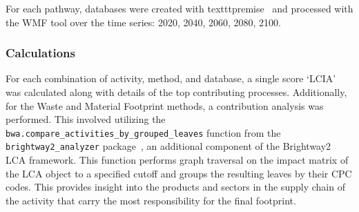 For each pathway, databases were created with texttt{premise}~\citep{sacchi2022premise} and processed with the WMF tool over the time series: 2020, 2040, 2060, 2080, 2100.

\subsubsection{Calculations}
For each combination of activity, method, and database, a single score `LCIA' was calculated along with details of the top contributing processes. Additionally, for the Waste and Material Footprint methods, a contribution analysis was performed. This involved utilizing the \texttt{bwa.compare\_activities\_by\_grouped\_leaves} function from the \texttt{brightway2\_analyzer} package~\cite{mutel2016brightway2analyzer}, an additional component of the Brightway2 LCA framework. This function performs graph traversal on the impact matrix of the LCA object to a specified cutoff and groups the resulting leaves by their CPC codes. This provides insight into the products and sectors in the supply chain of the activity that carry the most responsibility for the final footprint.


